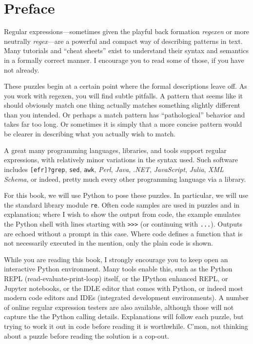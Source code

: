 \hypertarget{preface}{%
\chapter{Preface}\label{preface}}

Regular expressions---sometimes given the playful back formation
\emph{regexen} or more neutrally \emph{regex}---are a powerful and
compact way of describing patterns in text. Many tutorials and ``cheat
sheets'' exist to understand their syntax and semantics in a formally
correct manner. I encourage you to read some of those, if you have not
already.

These puzzles begin at a certain point where the formal descriptions
leave off. As you work with regexen, you will find subtle pitfalls. A
pattern that seems like it should obviously match one thing actually
matches something slightly different than you intended. Or perhaps a
match pattern has ``pathological'' behavior and takes far too long. Or
sometimes it is simply that a more concise pattern would be clearer in
describing what you actually wish to match.

A great many programming languages, libraries, and tools support regular
expressions, with relatively minor variations in the syntax used. Such
software includes \texttt{{[}efr{]}?grep}, \texttt{sed}, \texttt{awk},
\emph{Perl}, \emph{Java}, \emph{.NET}, \emph{JavaScript}, \emph{Julia},
\emph{XML Schema}, or indeed, pretty much every other programming
language via a library.

For this book, we will use Python to pose these puzzles. In particular,
we will use the standard library module \texttt{re}. Often code samples
are used in puzzles and in explanation; where I wish to show the output
from code, the example emulates the Python shell with lines starting
with \texttt{\textgreater{}\textgreater{}\textgreater{}} (or continuing
with \texttt{...}). Outputs are echoed without a prompt in this case.
Where code defines a function that is not necessarily executed in the
mention, only the plain code is shown.

While you are reading this book, I strongly encourage you to keep open
an interactive Python environment. Many tools enable this, such as the
Python REPL (read-evaluate-print-loop) itself, or the IPython enhanced
REPL, or Jupyter notebooks, or the IDLE editor that comes with Python,
or indeed most modern code editors and IDEs (integrated development
environments). A number of online regular expression testers are also
available, although those will not capture the the Python calling
details. Explanations will follow each puzzle, but trying to work it out
in code before reading it is worthwhile. C'mon, not thinking about a
puzzle before reading the solution is a cop-out.


